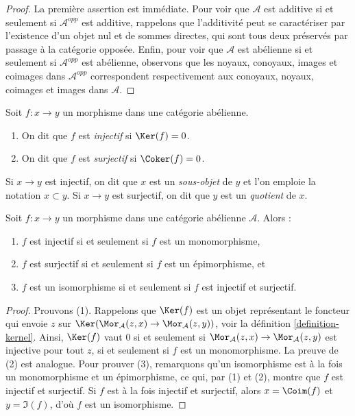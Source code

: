 \begin{proof}
La première assertion est immédiate.
Pour voir que $\mathcal{A}$ est additive si et seulement si $\mathcal{A}^{opp}$
est additive, rappelons que l'additivité peut se caractériser par
l'existence d'un objet nul et de sommes directes, qui sont tous deux
préservés par passage à la catégorie opposée.
Enfin, pour voir que
$\mathcal{A}$ est abélienne si et seulement si $\mathcal{A}^{opp}$ est abélienne,
observons que les noyaux, conoyaux, images et coimages dans
$\mathcal{A}^{opp}$ correspondent respectivement aux
conoyaux, noyaux, coimages et images dans $\mathcal{A}$.
\end{proof}

\begin{definition}
\label{definition-injective-surjective}
Soit $f : x \to y$ un morphisme dans une catégorie abélienne.
\begin{enumerate}
\item On dit que $f$ est {\it injectif} si $\Ker(f) = 0$.
\item On dit que $f$ est {\it surjectif} si $\Coker(f) = 0$.
\end{enumerate}
Si $x \to y$ est injectif, on dit que $x$ est un {\it sous-objet}
de $y$ et l'on emploie la notation $x \subset y$. Si $x \to y$ est
surjectif, on dit que $y$ est un {\it quotient} de $x$.
\end{definition}

\begin{lemma}
\label{lemma-characterize-injective}
Soit $f : x \to y$ un morphisme dans une catégorie abélienne $\mathcal{A}$. Alors :
\begin{enumerate}
\item $f$ est injectif si et seulement si $f$ est un monomorphisme,
\item $f$ est surjectif si et seulement si $f$ est un épimorphisme, et
\item $f$ est un isomorphisme si et seulement si $f$ est injectif et surjectif.
\end{enumerate}
\end{lemma}

\begin{proof}
Prouvons (1). Rappelons que $\Ker(f)$ est un objet représentant le
foncteur qui envoie $z$ sur
$\Ker(\Mor_\mathcal{A}(z, x) \to \Mor_\mathcal{A}(z, y))$, voir la
définition \ref{definition-kernel}.
Ainsi, $\Ker(f)$ vaut $0$ si et seulement si
$\Mor_\mathcal{A}(z, x) \to \Mor_\mathcal{A}(z, y)$
est injective pour tout $z$, si et seulement si $f$ est un monomorphisme.
La preuve de (2) est analogue.
Pour prouver (3), remarquons qu'un isomorphisme est à la fois un monomorphisme
et un épimorphisme, ce qui, par (1) et (2), montre que $f$ est injectif
et surjectif. Si $f$ est à la fois injectif et surjectif, alors
$x = \Coim(f)$ et $y = \Im(f)$, d'où $f$ est un isomorphisme.
\end{proof}

